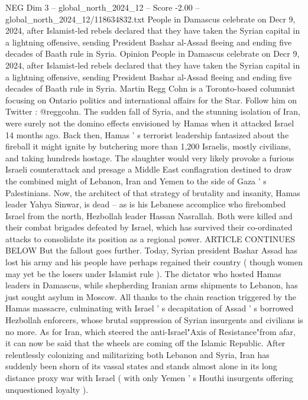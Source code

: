 \begin{textsample}{NEG Dim 3 – global\_north\_2024\_12 – Score -2.00 – global\_north\_2024\_12/118634832.txt}  \label{ex:f3_neg_221}
People in Damascus celebrate on Decr 9, 2024, after Islamist-led rebels declared that they have taken the Syrian capital in a lightning offensive, sending President Bashar al-Assad fleeing and ending five decades of Baath rule in Syria.
Opinion People in Damascus celebrate on Decr 9, 2024, after Islamist-led rebels declared that they have taken the Syrian capital in a lightning offensive, sending President Bashar al-Assad fleeing and ending five decades of Baath rule in Syria.
Martin Regg Cohn is a Toronto-based columnist focusing on Ontario politics and international affairs for the Star.
Follow him on Twitter : @reggcohn.
The sudden fall of Syria, and the stunning isolation of Iran, were surely not the domino effects envisioned by Hamas when it attacked Israel 14 months ago.
Back then, Hamas ' s terrorist leadership fantasized about the fireball it might ignite by butchering more than 1,200 Israelis, mostly civilians, and taking hundreds hostage.
The slaughter would very likely provoke a furious Israeli counterattack and presage a Middle East conflagration destined to draw the combined might of Lebanon, Iran and Yemen to the side of Gaza ' s Palestinians.
Now, the architect of that strategy of brutality and insanity, Hamas leader Yahya Sinwar, is dead -- as is his Lebanese accomplice who firebombed Israel from the north, Hezbollah leader Hassan Nasrallah.
Both were killed and their combat brigades defeated by Israel, which has survived their co-ordinated attacks to consolidate its position as a regional power.
ARTICLE CONTINUES BELOW But the fallout goes further.
Today, Syrian president Bashar Assad has lost his army and his people have perhaps regained their country ( though women may yet be the losers under Islamist rule ).
The dictator who hosted Hamas leaders in Damascus, while shepherding Iranian arms shipments to Lebanon, has just sought asylum in Moscow.
All thanks to the chain reaction triggered by the Hamas massacre, culminating with Israel ' s decapitation of Assad ' s borrowed Hezbollah enforcers, whose brutal suppression of Syrian insurgents and civilians is no more.
As for Iran, which steered the anti-Israel"Axis of Resistance"from afar, it can now be said that the wheels are coming off the Islamic Republic.
After relentlessly colonizing and militarizing both Lebanon and Syria, Iran has suddenly been shorn of its vassal states and stands almost alone in its long distance proxy war with Israel ( with only Yemen ' s Houthi insurgents offering unquestioned loyalty ).

\end{textsample}
